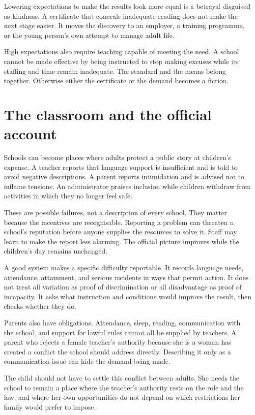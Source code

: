 \documentclass[12pt,a4paper]{book}
\begin{document}
Lowering expectations to make the results look more equal is a betrayal disguised as kindness. A certificate that conceals inadequate reading does not make the next stage easier. It moves the discovery to an employer, a training programme, or the young person's own attempt to manage adult life.

High expectations also require teaching capable of meeting the need. A school cannot be made effective by being instructed to stop making excuses while its staffing and time remain inadequate. The standard and the means belong together. Otherwise either the certificate or the demand becomes a fiction.

\section*{The classroom and the official account}

Schools can become places where adults protect a public story at children's expense. A teacher reports that language support is insufficient and is told to avoid negative descriptions. A parent reports intimidation and is advised not to inflame tensions. An administrator praises inclusion while children withdraw from activities in which they no longer feel safe.

These are possible failures, not a description of every school. They matter because the incentives are recognisable. Reporting a problem can threaten a school's reputation before anyone supplies the resources to solve it. Staff may learn to make the report less alarming. The official picture improves while the children's day remains unchanged.

A good system makes a specific difficulty reportable. It records language needs, attendance, attainment, and serious incidents in ways that permit action. It does not treat all variation as proof of discrimination or all disadvantage as proof of incapacity. It asks what instruction and conditions would improve the result, then checks whether they do.

Parents also have obligations. Attendance, sleep, reading, communication with the school, and support for lawful rules cannot all be supplied by teachers. A parent who rejects a female teacher's authority because she is a woman has created a conflict the school should address directly. Describing it only as a communication issue can hide the demand being made.

The child should not have to settle this conflict between adults. She needs the school to remain a place where the teacher's authority rests on the role and the law, and where her own opportunities do not depend on which restrictions her family would prefer to impose.
\end{document}
